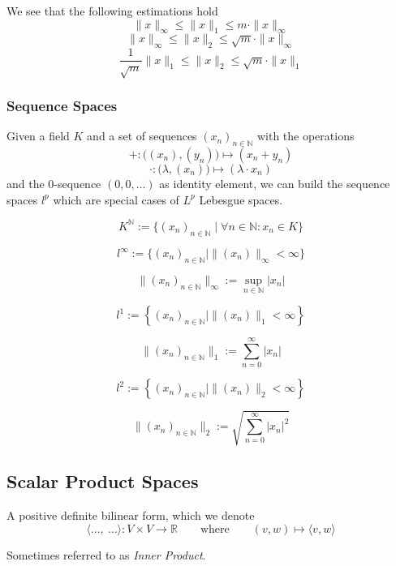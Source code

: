 We see that the following estimations hold
\[\|x\|_\infty \leq \|x\|_1 \leq m \cdot \|x\|_\infty\]
\[\|x\|_\infty \leq \|x\|_2 \leq \sqrt{m} \cdot \|x\|_\infty\]
\[\frac{1}{\sqrt{m}}\|x\|_1 \leq \|x\|_2 \leq \sqrt{m} \cdot \|x\|_1\]

\subsubsection{Sequence Spaces}
Given a field \(K\) and a set of sequences \((x_n)_{n \in \mathbb{N}}\) with the operations
\[+: \big((x_n), (y_n)\big) \mapsto (x_n + y_n)\]
\[\cdot: \big(\lambda, (x_n)\big) \mapsto (\lambda \cdot x_n)\]
and the 0-sequence \((0, 0, \ldots)\) as identity element, we can build the sequence spaces \(l^p\) which are special cases of \(L^p\) Lebesgue spaces.

\begin{definition}[Sequences]
   \[K^{\mathbb{N}} := \{(x_n)_{n \in \mathbb{N}} \mid \forall n \in \mathbb{N}: x_n \in K\}\]
\end{definition}

\begin{definition}
   \[l^\infty := \{(x_n)_{n \in \mathbb{N}} \mid \|(x_n)\|_\infty < \infty\}\]
\end{definition}
\begin{remark}
   \[\|(x_n)_{n \in \mathbb{N}}\|_\infty := \sup_{n \in \mathbb{N}} |x_n|\]
\end{remark}

\begin{definition}
   \[l^1 := \left\{(x_n)_{n \in \mathbb{N}} \mid \|(x_n)\|_1 < \infty\right\}\]
\end{definition}
\begin{remark}
   \[\|(x_n)_{n \in \mathbb{N}}\|_1 := \sum_{n=0}^\infty |x_n|\]
\end{remark}

\begin{definition}
   \[l^2 := \left\{(x_n)_{n \in \mathbb{N}} \mid \|(x_n)\|_2 < \infty\right\}\]
\end{definition}
\begin{remark}
   \[\|(x_n)_{n \in \mathbb{N}}\|_2 := \sqrt{\sum_{n=0}^\infty |x_n|^2}\]
\end{remark}

\subsection{Scalar Product Spaces}
\begin{definition}\label{def:scalar_product}
   A positive definite bilinear form, which we denote
   \[\langle \ldots,~ \ldots\rangle: V \times V \to \mathbb{R} \qquad\text{where}\qquad (v, w) \mapsto \langle v, w\rangle\]
\end{definition}
\begin{remark}
   Sometimes referred to as \emph{Inner Product}.
\end{remark}

